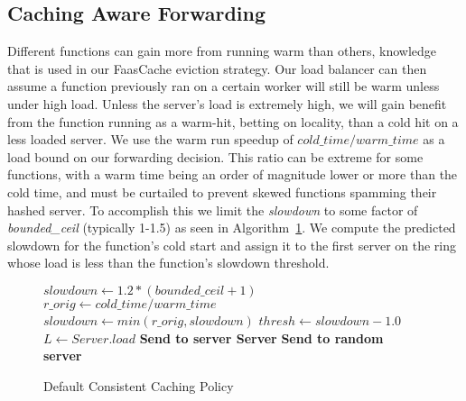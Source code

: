 \subsection{Caching Aware Forwarding}

Different functions can gain more from running warm than others, knowledge that is used in our FaasCache eviction strategy.
Our load balancer can then assume a function previously ran on a certain worker will still be warm unless under high load.
Unless the server's load is extremely high, we will gain benefit from the function running as a warm-hit, betting on locality, than a cold hit on a less loaded server.
We use the warm run speedup of $cold\_time / warm\_time$ as a load bound on our forwarding decision.
This ratio can be extreme for some functions, with a warm time being an order of magnitude lower or more than the cold time, and must be curtailed to prevent skewed functions spamming their hashed server.
To accomplish this we limit the \textit{slowdown} to some factor of \textit{bounded\_ceil} (typically 1-1.5) as seen in Algorithm~\ref{algo:ConsistentCachePolicy}.
We compute the predicted slowdown for the function's cold start and assign it to the first server on the ring whose load is less than the function's slowdown threshold.


\begin{figure}
  \begin{algorithmic}[1]
    \State $slowdown \gets 1.2*(bounded\_ceil+1)$
      \State $r\_orig \gets cold\_time / warm\_time$
      \State $slowdown \gets min(r\_orig, slowdown)$
    \EndIf
    \State $thresh \gets slowdown-1.0$
      \State $L \gets Server.load$
        \State \textbf{Send to server Server}
      \EndIf
    \EndFor
    \State \textbf{Send to random server}
  \end{algorithmic}
  \caption{Default Consistent Caching Policy}
\label{algo:ConsistentCachePolicy}    
\end{figure}

